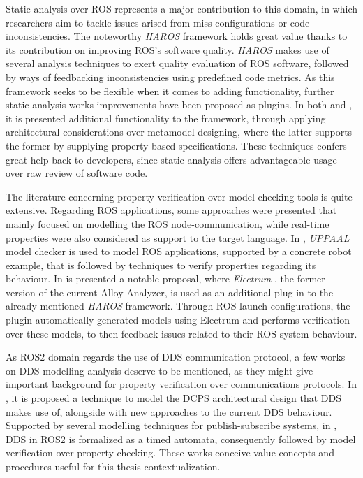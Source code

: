 Static analysis over ROS represents a major contribution to this domain, in which researchers aim to tackle issues arised from miss configurations or code inconsistencies. The noteworthy  \textit{HAROS} framework \cite{santos2016framework} holds great value thanks to its contribution on improving ROS's software quality. \textit{HAROS} makes use of several analysis techniques to exert quality evaluation of ROS software, followed by ways of feedbacking inconsistencies using predefined code metrics. As this framework seeks to be flexible when it comes to adding functionality, further static analysis works improvements have been proposed as plugins. In both \cite{santos2019static} and \cite{santos2018property}, it is presented additional functionality to the framework, through applying architectural considerations over metamodel designing, where the latter supports the former by supplying property-based specifications. These techniques confers great help back to developers, since static analysis offers advantageable usage over raw review of software code. 

The literature concerning property verification over model checking tools is quite extensive. Regarding ROS applications, some approaches were presented that mainly focused on modelling the ROS node-communication, while real-time properties were also considered as support to the target language. In \cite{halder2017formal}, \textit{UPPAAL} model checker is used to model ROS applications, supported by a concrete robot example, that is followed by techniques to verify properties regarding its behaviour. In \cite{9341085} is presented a notable proposal, where \textit{Electrum} \cite{lwspecification}, the former version of the current Alloy Analyzer, is used as an additional plug-in to the already mentioned \textit{HAROS} framework. Through ROS launch configurations, the plugin automatically generated models using Electrum and performs verification over these models, to then feedback issues related to their ROS system behaviour.

As ROS2 domain regards the use of DDS communication protocol, a few works on DDS modelling analysis deserve to be mentioned, as they might give important background for property verification over communications protocols. In \cite{alaerjan2017modeling}, it is proposed a technique to model the DCPS architectural design that DDS makes use of, alongside with new approaches to the current DDS behaviour. Supported by several modelling techniques for publish-subscribe systems, in \cite{liu2018formal}, DDS in ROS2 is formalized as a timed automata, consequently followed by model verification over property-checking. These works conceive value concepts and procedures useful for this thesis contextualization.

